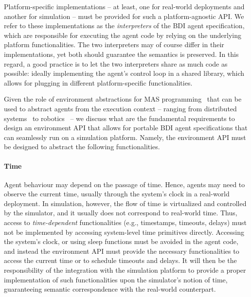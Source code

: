 Platform-specific implementations
-- at least, one for real-world deployments and another for simulation --
must be provided for such a platform-agnostic \ac{API}.
%
We refer to these implementations
as the \emph{interpreters} of the \ac{BDI} agent specification,
which are responsible for executing the agent code
by relying on the underlying platform functionalities.
%
The two interpreters may of course differ in their implementations,
yet both should guarantee the \agentspeak{} semantics is preserved.
%
In this regard,
a good practice is to let the two interpreters share as much code as possible:
ideally implementing the agent's control loop in a shared library,
which allows for plugging in different platform-specific functionalities.

Given the role of environment abstractions
for \ac{MAS} programming~\cite{weyns2007aamas}
that can be used to abstract agents from the execution context%
-- ranging from distributed systems~\cite{IssicabaRPB17} to robotics~\cite{pantoja2016atal,moro2022paams} --%
we discuss what are the fundamental requirements
to design an environment \ac{API}
that allows for portable \ac{BDI} agent specifications
that can seamlessly run on a simulation platform.
%
Namely, the environment \ac{API} must be designed to abstract the following functionalities.


\paragraph{Time}
Agent behaviour may depend on the passage of time.
%
Hence, agents may need to observe the current time,
usually through the system's clock in a real-world deployment.
%
In simulation, however, the flow of time is virtualized and controlled by the simulator,
and it usually does not correspond to real-world time.
%
Thus, access to \emph{time-dependent} functionalities
(e.g., timestamps, timeouts, delays)
must not be implemented by accessing system-level time primitives directly.
%
Accessing the system's clock, or using sleep functions
must be avoided in the agent code,
and instead the environment \ac{API} must provide the necessary functionalities
to access the current time
or to schedule timeouts and delays.
%
It will then be the responsibility of the integration with the simulation platform
to provide a proper implementation of such functionalities
upon the simulator's notion of time,
guaranteeing semantic correspondence with the real-world counterpart.


